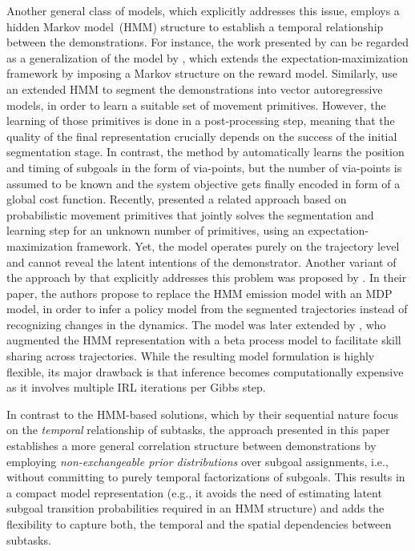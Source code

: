 \documentclass[twoside,11pt]{article}
\newcommand{\ie}{i.e.}
\newcommand{\eg}{e.g.}
\begin{document}
Another general class of models, which explicitly addresses this issue, employs a hidden Markov model~(HMM) structure to establish a temporal relationship between the demonstrations. For instance, the work presented by \cite{nguyen2015inverse} can be regarded as a generalization of the model by \citet{babes2011apprenticeship}, which extends the expectation-maximization framework by imposing a Markov structure on the reward model.
%
%
Similarly, \citet{niekum2012learning} use an extended HMM to segment the demonstrations into %
vector autoregressive models, %
in order to learn a suitable set of %
movement primitives. However, the learning of those primitives %
%
is done in a post-processing step, %
meaning that the quality of the %
final representation crucially depends on the success of the initial segmentation stage. %
In contrast, the method by \citet{Rueckert2013} automatically learns the position and timing of subgoals in the form of via-points, but the number of via-points is assumed to be known and %
the system objective gets finally encoded in form of a global cost function.  Recently, \citet{lioutikov2017learning} presented a related approach based on probabilistic movement primitives that jointly solves the segmentation and learning step for an unknown number of primitives, %
using an expectation-maximization framework. Yet, the model operates purely on the trajectory level and cannot %
reveal the latent intentions of the demonstrator.
%
Another variant of the approach by \citet{niekum2012learning} that explicitly addresses this problem was proposed by \citet{surana2014bayesian}. In their paper, the authors propose to replace the HMM emission model with an MDP model, in order to infer a policy model from the segmented trajectories instead of recognizing changes in the dynamics. The model was later extended by \cite{ranchod2015nonparametric}, who %
augmented the HMM representation with a beta process model %
to facilitate skill sharing across trajectories. While the resulting model formulation is highly flexible, its major drawback %
 is that inference %
%
becomes computationally expensive as it involves multiple IRL iterations %
per Gibbs step.

In contrast to the %
HMM-based solutions, which by their %
sequential nature focus on the \textit{temporal} relationship of subtasks, 
%
the approach presented in this paper establishes a more general correlation structure between demonstrations by employing %
\textit{non-exchangeable prior distributions} over subgoal assignments, \ie, 
without committing to %
purely temporal factorizations of %
%
subgoals. This results in a compact model representation (\eg, it avoids the need of estimating %
 latent subgoal transition probabilities required in an HMM structure) and adds the flexibility to capture both, the {temporal} and the {spatial} dependencies %
between subtasks.
\end{document}
